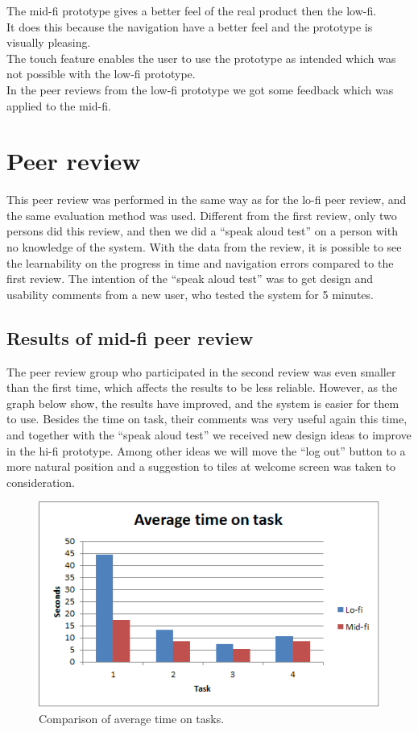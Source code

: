 The mid-fi prototype gives a better feel of the real product then the low-fi.\\
It does this because the navigation have a better feel and the prototype is visually pleasing.\\
The touch feature enables the user to use the prototype as intended which was not possible with the low-fi prototype.\\
In the peer reviews from the low-fi prototype we got some feedback which was applied to the mid-fi.\\


\section{Peer review}
This peer review was performed in the same way as for the lo-fi peer review, and the same evaluation method was used. Different from the first review, only two persons did this review, and then we did a “speak aloud test” on a person with no knowledge of the system. With the data from the review, it is possible to see the learnability on the progress in time and navigation errors compared to the first review. The intention of the “speak aloud test” was to get design and usability comments from a new user, who tested the system for 5 minutes. \\
\subsection{Results of mid-fi peer review}
The peer review group who participated in the second review was even smaller than the first time, which affects the results to be less reliable. However, as the graph below show, the results have improved, and the system is easier for them to use. Besides the time on task, their comments was very useful again this time, and together with the “speak aloud test” we received new design ideas to improve in the hi-fi prototype. Among other ideas we will move the “log out” button to a more natural position and a suggestion to tiles at welcome screen was taken to consideration. \\

\begin{figure}[H]
\centering
\includegraphics[width=.7\textwidth]{billeder/AverageTime}
\caption{Comparison of average time on tasks.}
\end{figure}
